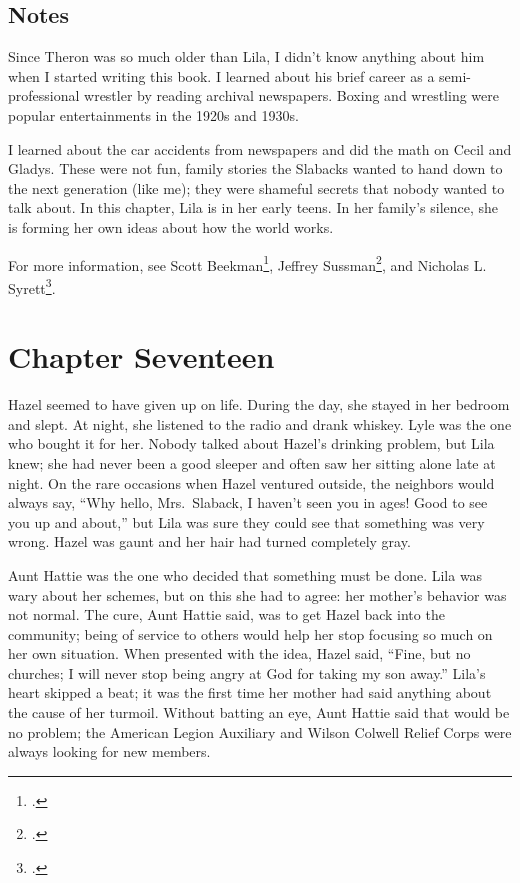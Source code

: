 \documentclass[
  letterpaper,
]{book}
\begin{document}
\section{Notes}\label{notes-17}

Since Theron was so much older than Lila, I didn't know anything about
him when I started writing this book. I learned about his brief career
as a semi-professional wrestler by reading archival newspapers. Boxing
and wrestling were popular entertainments in the 1920s and 1930s.

I learned about the car accidents from newspapers and did the math on
Cecil and Gladys. These were not fun, family stories the Slabacks wanted
to hand down to the next generation (like me); they were shameful
secrets that nobody wanted to talk about. In this chapter, Lila is in
her early teens. In her family's silence, she is forming her own ideas
about how the world works.

For more information, see Scott Beekman\footnote{.}, Jeffrey Sussman\footnote{.}, and Nicholas L. Syrett\footnote{.}.


\chapter{Chapter Seventeen}\label{chapter-seventeen}

Hazel seemed to have given up on life. During the day, she stayed in her
bedroom and slept. At night, she listened to the radio and drank
whiskey. Lyle was the one who bought it for her. Nobody talked about
Hazel's drinking problem, but Lila knew; she had never been a good
sleeper and often saw her sitting alone late at night. On the rare
occasions when Hazel ventured outside, the neighbors would always say,
``Why hello, Mrs.~Slaback, I haven't seen you in ages! Good to see you
up and about,'' but Lila was sure they could see that something was very
wrong. Hazel was gaunt and her hair had turned completely gray.

Aunt Hattie was the one who decided that something must be done. Lila
was wary about her schemes, but on this she had to agree: her mother's
behavior was not normal. The cure, Aunt Hattie said, was to get Hazel
back into the community; being of service to others would help her stop
focusing so much on her own situation. When presented with the idea,
Hazel said, ``Fine, but no churches; I will never stop being angry at
God for taking my son away.'' Lila's heart skipped a beat; it was the
first time her mother had said anything about the cause of her turmoil.
Without batting an eye, Aunt Hattie said that would be no problem; the
American Legion Auxiliary and Wilson Colwell Relief Corps were always
looking for new members.
\end{document}

